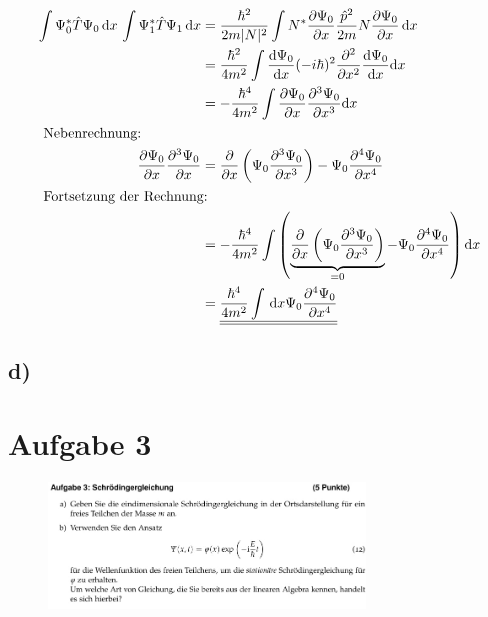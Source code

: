 \begin{align}
    \int \Psi _0^* \hat T \Psi _0 \,\mathrm{d}x\,\int \Psi _1^* \hat T \Psi _1 \, \mathrm{d}x&= \frac{\hbar ^2}{2m\lvert N\rvert^2} \int N^* \frac{\partial \Psi _0}{\partial x} \frac{\hat p ^2}{2m} N \frac{\partial \Psi _0}{\partial x} \,\mathrm{d}x\\
    &= \frac{\hbar ^2}{4m^2} \int \frac{\mathrm{d} \Psi _0}{\mathrm{d} x} (-i \hbar)^2 \frac{\partial ^2}{\partial x^2}\frac{\mathrm{d} \Psi _0}{\mathrm{d} x} \mathrm{d} x \nonumber\\
    &= -\frac{\hbar ^4}{4m^2} \int \frac{\partial \Psi _0}{\partial x} \frac{\partial ^3 \Psi _0}{\partial x^3} \mathrm{d}x\\
    \intertext{
        Nebenrechnung:
    }
    \frac{\partial \Psi _0}{\partial x}\frac{\partial ^3 \Psi _0}{\partial x}&=\frac{\partial}{\partial x}\left(\Psi _0 \frac{\partial ^3 \Psi _0}{\partial x^3} \right)-\Psi _0 \frac{\partial ^4 \Psi _0}{\partial x^4}\\
    \intertext{
        Fortsetzung der Rechnung:
    }
    &=-\frac{\hbar ^4}{4m^2} \int \left(\underbrace{ \frac{\partial}{\partial x}\left(\Psi _0 \frac{\partial ^3 \Psi _0}{\partial x^3}\right)}_{=0} -\Psi _0 \frac{\partial ^4 \Psi _0}{\partial x^4}  \right) \mathrm{d}x \nonumber\\
    &= \underline{\underline{\frac{\hbar ^4}{4m^2} \int\,\mathrm{d}x \Psi _0 \frac{\partial ^4\Psi _0}{\partial x^4}  }}
\end{align}


\subsection{d)}



\section{Aufgabe 3}

\begin{figure}[H]
    \centering
    \includegraphics[width=0.75\textwidth]{images/Aufgabe_3ab.jpg}
    \label{fig:3}
\end{figure}

